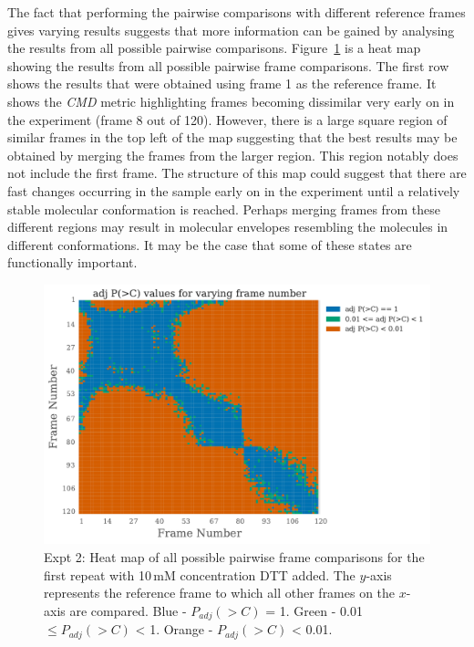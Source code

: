 The fact that performing the pairwise comparisons with different reference frames gives varying results suggests that more information can be gained by analysing the results from all possible pairwise comparisons.
Figure~\ref{fig:heatmap - DTT} is a heat map showing the results from all possible pairwise frame comparisons.
The first row shows the results that were obtained using frame 1 as the reference frame.
It shows the \textit{CMD} metric highlighting frames becoming dissimilar very early on in the experiment (frame 8 out of 120).
However, there is a large square region of similar frames in the top left of the map suggesting that the best results may be obtained by merging the frames from the larger region.
This region notably does not include the first frame.
The structure of this map could suggest that there are fast changes occurring in the sample early on in the experiment until a relatively stable molecular conformation is reached.
Perhaps merging frames from these different regions may result in molecular envelopes resembling the molecules in different conformations.
It may be the case that some of these states are functionally important.
\begin{figure}
    \centering
    \includegraphics[width=1.0\textwidth]{figures/saxs/dtt_heatmap.pdf}
    \caption[Heat map of all possible pairwise frame comparisons for the first repeat with 10\,mM concentration DTT added]{Expt 2: Heat map of all possible pairwise frame comparisons for the first repeat with 10\,mM concentration DTT added.
    The $y$-axis represents the reference frame to which all other frames on the $x$-axis are compared.
    Blue - $P_{adj}(>C)$ = 1. Green - 0.01 $\le P_{adj}(>C)$ < 1. Orange - $P_{adj}(>C)$ < 0.01.}
    \label{fig:heatmap - DTT}
\end{figure}

